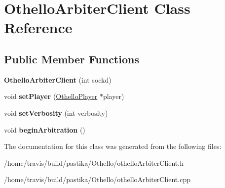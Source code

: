 \hypertarget{classOthelloArbiterClient}{\section{Othello\-Arbiter\-Client Class Reference}
\label{classOthelloArbiterClient}
}
\subsection*{Public Member Functions}
\begin{DoxyCompactItemize}
\item 
\hypertarget{classOthelloArbiterClient_afbaee18450509edf7a5d131d62f2fbe9}{{\bfseries Othello\-Arbiter\-Client} (int sockd)}\label{classOthelloArbiterClient_afbaee18450509edf7a5d131d62f2fbe9}

\item 
\hypertarget{classOthelloArbiterClient_a9020db71b40c949e9ea2b6edfccb0df9}{void {\bfseries set\-Player} (\hyperlink{classOthelloPlayer}{Othello\-Player} $\ast$player)}\label{classOthelloArbiterClient_a9020db71b40c949e9ea2b6edfccb0df9}

\item 
\hypertarget{classOthelloArbiterClient_ad14af76840bc25e19396fbad7a713333}{void {\bfseries set\-Verbosity} (int verbosity)}\label{classOthelloArbiterClient_ad14af76840bc25e19396fbad7a713333}

\item 
\hypertarget{classOthelloArbiterClient_a710bc44f7d82eff7937071dbeab1ff6a}{void {\bfseries begin\-Arbitration} ()}\label{classOthelloArbiterClient_a710bc44f7d82eff7937071dbeab1ff6a}

\end{DoxyCompactItemize}


The documentation for this class was generated from the following files\-:\begin{DoxyCompactItemize}
\item 
/home/travis/build/pastika/\-Othello/othello\-Arbiter\-Client.\-h\item 
/home/travis/build/pastika/\-Othello/othello\-Arbiter\-Client.\-cpp\end{DoxyCompactItemize}
